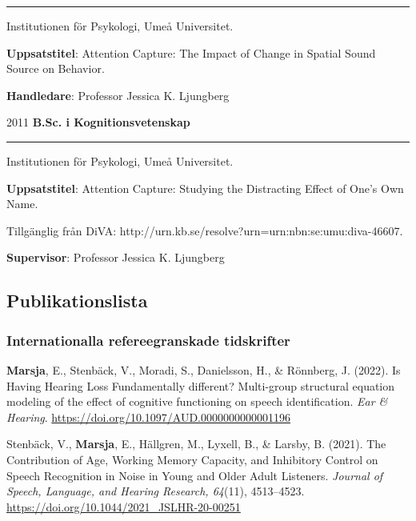 \documentclass[]{article}
\begin{document}
\hrule
\begin{changemargin}{2.3cm}{2.4cm}

Institutionen för Psykologi, Umeå Universitet.

\textbf{Uppsatstitel}: Attention Capture: The Impact of Change in Spatial Sound Source on Behavior. 
    
\textbf{Handledare}: Professor Jessica K. Ljungberg
\end{changemargin}

2011 \hspace{1.5cm}\textbf{B.Sc. i Kognitionsvetenskap}\vspace{1mm}

\hrule

\begin{changemargin}{2.3cm}{2.4cm}

Institutionen för Psykologi, Umeå Universitet.

\textbf{Uppsatstitel}:  Attention Capture: Studying the Distracting Effect of One’s Own Name.

Tillgänglig från DiVA: \sloppy http://urn.kb.se/resolve?urn=urn:nbn:se:umu:diva-46607.
    
\textbf{Supervisor}: Professor Jessica K. Ljungberg
\end{changemargin}

\hypertarget{publikationslista}{%
\subsection{Publikationslista}\label{publikationslista}}

\hypertarget{internationalla-refereegranskade-tidskrifter}{%
\subsubsection{Internationalla refereegranskade
tidskrifter}\label{internationalla-refereegranskade-tidskrifter}}

\textbf{Marsja}, E., Stenbäck, V., Moradi, S., Danielsson, H., \&
Rönnberg, J. (2022). Is Having Hearing Loss Fundamentally different?
Multi-group structural equation modeling of the effect of cognitive
functioning on speech identification. \emph{Ear \& Hearing}.
\url{https://doi.org/10.1097/AUD.0000000000001196}

Stenbäck, V., \textbf{Marsja}, E., Hällgren, M., Lyxell, B., \& Larsby,
B. (2021). The Contribution of Age, Working Memory Capacity, and
Inhibitory Control on Speech Recognition in Noise in Young and Older
Adult Listeners. \emph{Journal of Speech, Language, and Hearing
Research, 64}(11), 4513--4523.
\url{https://doi.org/10.1044/2021_JSLHR-20-00251}
\end{document}
